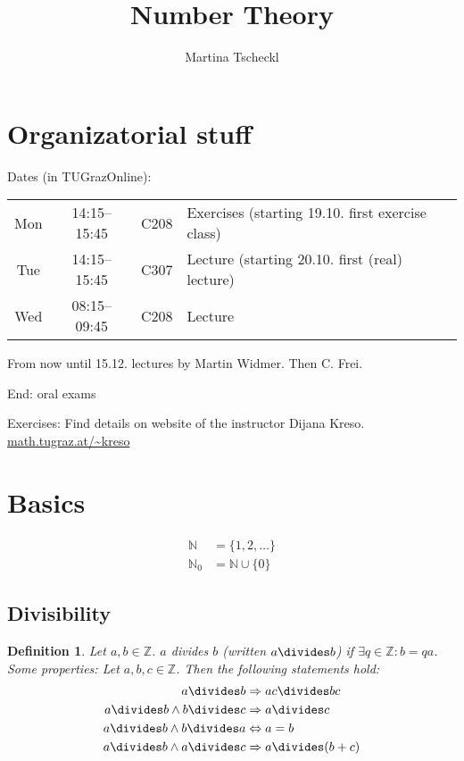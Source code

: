 \documentclass[a4paper]{article}
\author{Martina Tscheckl}
\title{Number Theory}
\newtheorem{defi}{Definition}
\newcommand{\N}{\mathbb{N}}
\newcommand{\Z}{\mathbb{Z}}
\begin{document}
\maketitle
\tableofcontents

\section*{Organizatorial stuff}

Dates (in TUGrazOnline):
\begin{table}[!h]
  \begin{tabular}{cccl}
    Mon & 14:15--15:45 & C208 & Exercises (starting 19.10. first exercise class) \\
    Tue & 14:15--15:45 & C307 & Lecture (starting 20.10. first (real) lecture) \\
    Wed & 08:15--09:45 & C208 & Lecture
  \end{tabular}
\end{table}

From now until 15.12. lectures by Martin Widmer.
Then C. Frei.

End: oral exams

Exercises: Find details on website of the instructor Dijana Kreso.
\url{math.tugraz.at/~kreso}

\section{Basics}

\begin{align}
  \N &= \{1,2,\dots\} \\
  \N_0 &= \N \cup \{0\}
\end{align}

\subsection{Divisibility}
\begin{defi}
Let $a,b \in \Z$. $a$ divides $b$ (written $a\divides b$) if $\exists q \in \Z : b = qa$.
\newline
Some properties: Let $a,b,c \in \Z$. Then the following statements hold:
\begin{align}
  a\divides b &\Rightarrow ac\divides bc \\
  a\divides b \land b\divides c &\Rightarrow a\divides c \\
  a\divides b \land b\divides a &\Leftrightarrow a = b \\
  a\divides b \land a\divides c &\Rightarrow a\divides (b+c)
\end{align}
\end{defi}
\end{document}
